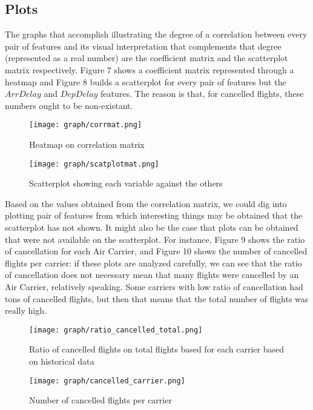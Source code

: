 \documentclass{article}
\begin{document}
	\subsection{Plots}
		The graphs that accomplish illustrating the degree of a correlation between every pair of features and its visual interpretation that complements that degree (represented as a real number) are the coefficient matrix and the scatterplot matrix respectively. Figure 7 shows a coefficient matrix represented through a heatmap and Figure 8 builds a scatterplot for every pair of features but the $ArrDelay$ and $DepDelay$ features. The reason is that, for cancelled flights, these numbers ought to be non-existant.
		\begin{figure}[H]
			\centered
	      \texttt{[image: graph/corrmat.png]}
	      \caption{Heatmap on correlation matrix}
	      \label{fig:graph1}
	    \end{figure}
		\begin{figure}[H]
		  \texttt{[image: graph/scatplotmat.png]}
		  \caption{Scatterplot showing each variable against the others}
		  \label{fig:graph1}
		\end{figure}\newline
    \indent Based on the values obtained from the correlation matrix, we could dig into plotting pair of features from which interesting things may be obtained that the scatterplot has not shown. It might also be the case that plots can be obtained that were not available on the scatterplot. For instance, Figure 9 shows the ratio of cancellation for each Air Carrier, and Figure 10 shows the number of cancelled flights per carrier: if these plots are analyzed carefully, we can see that the ratio of cancellation does not necessary mean that many flights were cancelled by an Air Carrier, relatively speaking. Some carriers with low ratio of cancellation had tons of cancelled flights, but then that means that the total number of flights was really high.
	\begin{figure}[H]
		\texttt{[image: graph/ratio\_cancelled\_total.png]}
		\caption{Ratio of cancelled flights on total flights based for each carrier based on historical data}
		\label{fig:graph1}
	\end{figure}
	\begin{figure}[H]
		\texttt{[image: graph/cancelled\_carrier.png]}
		\caption{Number of cancelled flights per carrier}
		\label{fig:graph1}
	\end{figure}\newline
\end{document}
